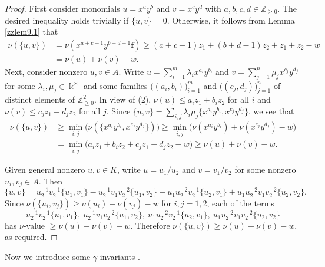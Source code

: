 \documentclass[12pt]{amsart}
\theoremstyle{plain}
\numberwithin{theorem}{section}
\numberwithin{equation}{theorem}
\theoremstyle{definition}
\newcommand{\ZZ}{\mathbb{Z}}
\newcommand \bff {{\mathbf{f}}}
\newcommand \Znn {\ZZ_{\ge 0}}
\newcommand \kx {\Bbbk^\times}
\begin{document}
\begin{proof}
First consider monomials $u = x^ay^b$ and $v = x^cy^d$ with $a,b,c,d \in \Znn$.  The desired inequality holds trivially if $\{u,v\} = 0$.  Otherwise, it follows from Lemma \ref{zzlem9.1} that
\begin{align*}
\nu(\{u,v\}) &= \nu( x^{a+c-1} y^{b+d-1} \bff ) \ge (a+c-1)z_1 + (b+d-1)z_2 + z_1+z_2-w  \\
&= \nu(u) + \nu(v) - w.
\end{align*}
Next, consider nonzero $u,v \in A$.  Write $u = \sum_{i=1}^m \lambda_i x^{a_i} y^{b_i}$ and $v = \sum_{j=1}^n \mu_j x^{c_j} y^{d_j}$ for some $\lambda_i,\mu_j \in \kx$ and some families $\bigl( (a_i,b_i) \bigr)_{i=1}^m$ and $\bigl( (c_j,d_j) \bigr)_{j=1}^n$ of distinct elements of $\Znn^2$.  In view of (2), $\nu(u) \le a_iz_1+b_iz_2$ for all $i$ and $\nu(v) \le c_jz_1+d_jz_2$ for all $j$.  Since $\{u,v\} = \sum_{i,j} \lambda_i \mu_j \{ x^{a_i} y^{b_i}, x^{c_j} y^{d_j} \}$, we see that
\begin{align*}
\nu(\{u,v\}) &\ge \underset{i,j}\min\bigl( \nu( \{ x^{a_i} y^{b_i}, x^{c_j} y^{d_j} \} ) \bigr) \ge \underset{i,j}\min\bigl( \nu(x^{a_i} y^{b_i}) + \nu(x^{c_j} y^{d_j}) - w \bigr)  \\
&= \underset{i,j}\min\bigl( a_iz_1+b_iz_2 + c_jz_1+d_jz_2 - w \bigr)  \ge \nu(u) + \nu(v) - w.
\end{align*}

Given general nonzero $u,v \in K$, write $u = u_1/u_2$ and $v = v_1/v_2$ for some nonzero $u_i,v_j \in A$.  Then
$$
\{u,v\} = u_2^{-1}v_2^{-1} \{u_1,v_1\} - u_2^{-1}v_1v_2^{-2} \{u_1,v_2\} - u_1u_2^{-2}v_2^{-1} \{u_2,v_1\} + u_1u_2^{-2}v_1v_2^{-2} \{u_2,v_2\}.
$$
Since $\nu(\{u_i,v_j\}) \ge \nu(u_i) + \nu(v_j) - w$ for $i,j=1,2$, each of the terms
$$
u_2^{-1}v_2^{-1} \{u_1,v_1\},\ u_2^{-1}v_1v_2^{-2} \{u_1,v_2\},\ u_1u_2^{-2}v_2^{-1} \{u_2,v_1\},\ u_1u_2^{-2}v_1v_2^{-2} \{u_2,v_2\}
$$
has $\nu$-value $\ge \nu(u)+\nu(v)-w$.  Therefore $\nu(\{u,v\}) \ge \nu(u)+\nu(v)-w$, as required.
\end{proof}

Now we introduce some $\gamma$-invariants 
\cite[Definition 4.1]{HTWZ1}.
\end{document}
